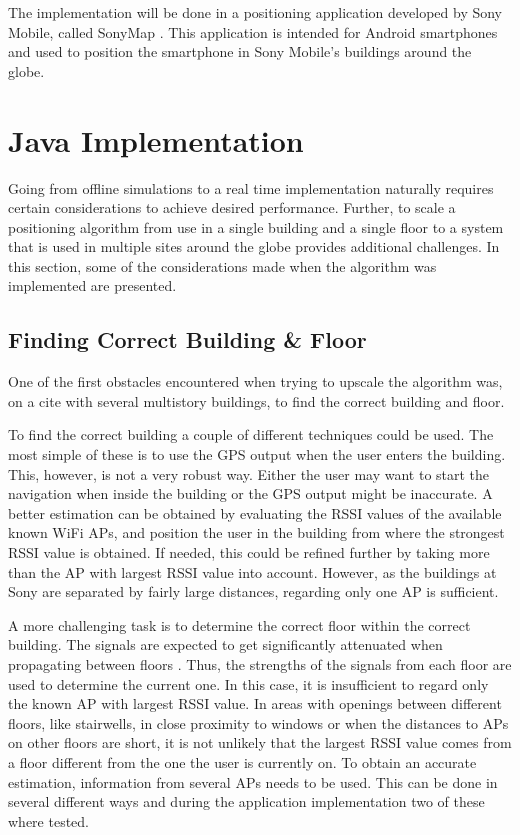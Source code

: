 \documentclass{LTHthesis}
\begin{document}
The implementation will be done in a positioning application developed by Sony Mobile, called SonyMap \cite{sonymap}. This application is intended for Android smartphones and used to  position the smartphone in Sony Mobile's buildings around the globe. 
%
\section{Java Implementation}
%
Going from offline simulations to a real time implementation naturally requires certain considerations to achieve desired performance. Further, to scale a positioning algorithm from use in a single building and a single floor to a system that is used in multiple sites around the globe provides additional challenges. In this section, some of the considerations made when the algorithm was implemented are presented. 
%
\subsection{Finding Correct Building \& Floor}
%
One of the first obstacles encountered when trying to upscale the algorithm was, on a cite with several multistory buildings, to find the correct building and floor. 

To find the correct building a couple of different techniques could be used. The most simple of these is to use the GPS output when the user enters the building. This, however, is not a very robust way. Either the user may want to start the navigation when inside the building or the GPS output might be inaccurate. A better estimation can be obtained by evaluating the RSSI values of the available known WiFi APs, and position the user in the building from where the strongest RSSI value is obtained. If needed, this could be refined further by taking more than the AP with largest RSSI value into account. However, as the buildings at Sony are separated by fairly large distances, regarding only one AP is sufficient.

A more challenging task is to determine the correct floor within the correct building. The signals are expected to get significantly attenuated when propagating between floors \cite{rappaport96}. Thus, the strengths of the signals from each floor are used to determine the current one. In this case, it is insufficient to regard only the known AP with largest RSSI value. In areas with openings between different floors, like stairwells, in close proximity to windows or when the distances to APs on other floors are short, it is not unlikely that the largest RSSI value comes from a floor different from the one the user is currently on. To obtain an accurate estimation, information from several APs needs to be used. This can be done in several different ways and during the application implementation two of these where tested.
\end{document}
